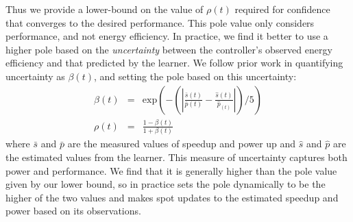 Thus we provide a lower-bound on the value of $\rho(t)$ required for
confidence that \SYSTEM{} converges to the desired performance.  This
pole value only considers performance, and not energy efficiency.  In
practice, we find it better to use a higher pole based on the
\emph{uncertainty} between the controller's observed energy efficiency
and that predicted by the learner.  We follow prior work
\cite{Tokic2010} in quantifying uncertainty as $\beta(t)$, and setting
the pole based on this uncertainty:
\begin{equation}
  \begin{array}{rcl}
    \beta(t) &=&  \text{exp}{\left(- \left( \left|   \frac{\bar{s}(t)}{\bar{p}(t)}  -\frac{ \hat{s}(t)}{\hat{p}_(t)} \right| \right) /5\right)} \\
    \rho(t) &=& \frac{1-\beta(t)}{1+\beta(t)} 
  \end{array}
  \label{eqn:uncer}
\end{equation}
where $\bar{s}$ and $\bar{p}$ are the measured values of speedup and
power up and $\hat{s}$ and $\hat{p}$ are the estimated values from the
learner.  This measure of uncertainty captures both power and
performance.  We find that it is generally higher than the pole value
given by our lower bound, so in practice \SYSTEM{} sets the pole
dynamically to be the higher of the two values and \SYSTEM{} makes
spot updates to the estimated speedup and power based on its
observations.

